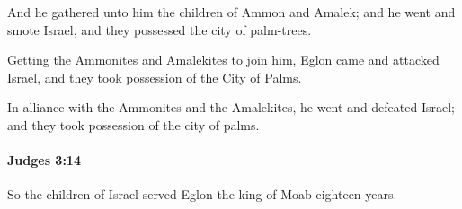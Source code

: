 			\begin{versebox}
					\item[BHS] 
					\item[ASV] And he gathered unto him the children of Ammon and Amalek; and he went and smote Israel, and they possessed the city of palm-trees.
					\item[NIV] Getting the Ammonites and Amalekites to join him, Eglon came and attacked Israel, and they took possession of the City of Palms.
					\item[NRSV] In alliance with the Ammonites and the Amalekites, he went and defeated Israel; and they took possession of the city of palms.
			\end{versebox}

		\paragraph{Judges 3:14} %
			\label{JUDGES-3-14}

			So the children of Israel served Eglon the king of Moab eighteen years.

